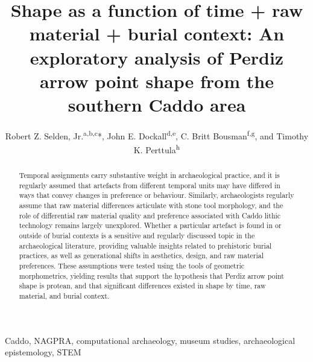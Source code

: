 \documentclass[review]{elsarticle}
\begin{document}
\begin{frontmatter}

\title{Shape as a function of time + raw material + burial context: An exploratory analysis of Perdiz arrow point shape from the southern Caddo area}

\author{Robert Z. Selden, Jr.\textsuperscript{a,b,c}*, John E. Dockall\textsuperscript{d,e}, C. Britt Bousman\textsuperscript{f,g}, and Timothy K. Perttula\textsuperscript{h}}
\address[1]{Heritage Research Center, Stephen F. Austin State University, US}
\address[2]{Cultural Heritage Department, Jean Monnet University, FR}
\address[3]{ORCID ID \href{http://orcid.org/0000-0002-1789-8449}{0000-0002-1789-8449}}
\address[4]{Cox|McClain Environmental Consulting, Inc., US}
\address[5]{ORCID ID \href{http://orcid.org/0000-0002-0940-7144}{0000-0002-0940-7144}}
\address[6]{Department of Anthropology, Texas State University, US}
\address[7]{ORCID ID \href{http://orcid.org/0000-0002-1645-8302}{0000-0002-1645-8302}}
\address[8]{Archeological \& Environmental Consultants, LLC, US}

\begin{abstract}
Temporal assignments carry substantive weight in archaeological practice, and it is regularly assumed that artefacts from different temporal units may have differed in ways that convey changes in preference or behaviour. Similarly, archaeologists regularly assume that raw material differences articulate with stone tool morphology, and the role of differential raw material quality and preference associated with Caddo lithic technology remains largely unexplored. Whether a particular artefact is found in or outside of burial contexts is a sensitive and regularly discussed topic in the archaeological literature, providing valuable insights related to prehistoric burial practices, as well as generational shifts in aesthetics, design, and raw material preferences. These assumptions were tested using the tools of geometric morphometrics, yielding results that support the hypothesis that Perdiz arrow point shape is protean, and that significant differences existed in shape by time, raw material, and burial context.
\end{abstract}

\begin{keyword}
Caddo, NAGPRA, computational archaeology, museum studies, archaeological epistemology, STEM
\end{keyword}

\end{frontmatter}
\end{document}
